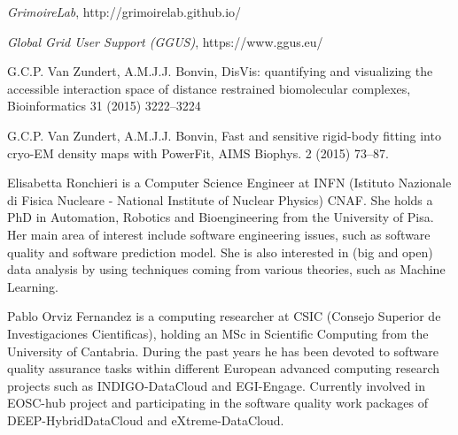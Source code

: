 \documentclass[journal]{IEEEtran}
\begin{document}
\begin{thebibliography}{1}
\emph{GrimoireLab}, http://grimoirelab.github.io/

\emph{Global Grid User Support (GGUS)}, https://www.ggus.eu/

 G.C.P. Van Zundert, A.M.J.J. Bonvin,
DisVis: quantifying and visualizing the accessible interaction space of distance
restrained biomolecular complexes, Bioinformatics 31 (2015) 3222–3224

 G.C.P. Van Zundert, A.M.J.J. Bonvin,
Fast and sensitive rigid-body fitting into cryo-EM density maps with PowerFit,
AIMS Biophys. 2 (2015) 73–87.

\end{thebibliography}

\begin{IEEEbiography} {Elisabetta Ronchieri}
is a Computer Science Engineer at INFN (Istituto Nazionale di Fisica Nucleare - National Institute of Nuclear Physics) CNAF. She holds a PhD in Automation, Robotics and Bioengineering from the University of Pisa. Her main area of interest include software engineering issues, such as software quality and software prediction model. She is also interested in (big and open) data analysis by using techniques coming from various theories, such as Machine Learning.
\end{IEEEbiography}

\begin{IEEEbiography}{Pablo Orviz Fernandez}
is a computing researcher at CSIC (Consejo Superior de Investigaciones
Cientificas), holding an MSc in Scientific Computing from the University of
Cantabria. During the past years he has been devoted to software quality
assurance tasks within different European advanced computing research projects
such as INDIGO-DataCloud and EGI-Engage. Currently involved in EOSC-hub project
and participating in the software quality work packages of DEEP-HybridDataCloud
and eXtreme-DataCloud.
\end{IEEEbiography}
\end{document}
